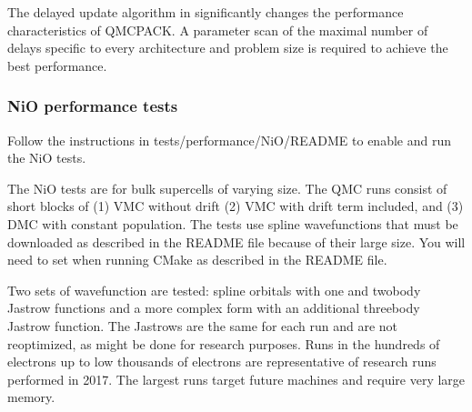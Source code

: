\documentclass[letterpaper,10pt,english]{sphinxmanual}
\begin{document}
The delayed update algorithm in {\hyperref[\detokenize{intro_wavefunction:singledeterminant}]{}}
significantly changes the performance characteristics of QMCPACK.  A
parameter scan of the maximal number of delays specific to every
architecture and problem size is required to achieve the best
performance.


\subsubsection{NiO performance tests}
\label{\detokenize{installation:nio-performance-tests}}
Follow the instructions in tests/performance/NiO/README to
enable and run the NiO tests.

The NiO tests are for bulk supercells of varying size. The QMC runs consist of short blocks of (1) VMC
without drift (2) VMC with drift term included, and (3) DMC with
constant population. The tests use spline wavefunctions that must be
downloaded as described in the README file because of their large size. You
will need to set 
when running CMake as
described in the README file.

Two sets of wavefunction are tested: spline orbitals with one\sphinxhyphen{} and
two\sphinxhyphen{}body Jastrow functions and a more complex form with an additional
three\sphinxhyphen{}body Jastrow function. The Jastrows are the same for each run
and are not reoptimized, as might be done for research purposes.  Runs
in the hundreds of electrons up to low thousands of electrons are representative of
research runs performed in 2017. The largest runs target
future machines and require very large memory.
\end{document}
